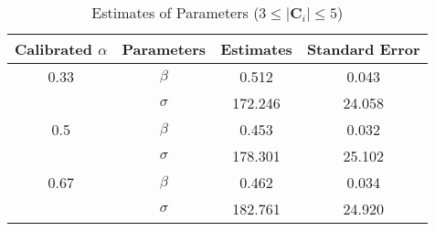 \begin{table}[H]
    \centering
    \caption{Estimates of Parameters ($3 \leq |\mathbf{C}_i| \leq 5$)}
    \label{table: estimates (min_size=3 max_size=5 margin=2000)}
    \begin{tabular}{cccc}
        \toprule
        Calibrated $\alpha$ & Parameters & Estimates & Standard Error \\
        \midrule
        0.33                & $\beta$    & 0.512     & 0.043          \\
                            & $\sigma$   & 172.246   & 24.058         \\
        \midrule
        0.5                 & $\beta$    & 0.453     & 0.032          \\
                            & $\sigma$   & 178.301   & 25.102         \\
        \midrule
        0.67                & $\beta$    & 0.462     & 0.034          \\
                            & $\sigma$   & 182.761   & 24.920         \\
        \bottomrule
    \end{tabular}
\end{table}

